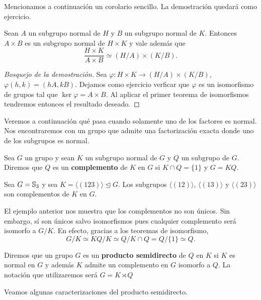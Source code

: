 Mencionamos a continuación un corolario sencillo. La demostración quedará como ejercicio. 

\begin{corollary}
Sean $A$ un subgrupo normal de $H$ y $B$ un subgrupo normal de $K$. Entonces $A\times B$ es un subgrupo normal de $H\times K$ y vale además que
\[
\frac{H\times K}{A\times B}\simeq(H/A)\times(K/B).
\]	
\end{corollary}

\begin{proof}[Bosquejo de la demostración]
Sea $\varphi\colon H\times K\to(H/A)\times(K/B)$, $\varphi(h,k)=(hA,kB)$. Dejamos como ejercicio verficar que $\varphi$ es un isomorfismo de grupos tal que $\ker\varphi=A\times B$. Al aplicar el primer teorema de isomorfismos tendremos entonces el resultado deseado. 
\end{proof}

Veremos a continuación qué pasa cuando solamente uno de los factores es normal. Nos encontraremos con un grupo que admite una factorización exacta donde uno de los subgrupos es normal.  

\begin{definition}
Sea $G$ un grupo y sean $K$ un subgrupo normal de $G$ y $Q$ un subgrupo de $G$. Diremos que $Q$ es un \textbf{complemento} de $K$ en $G$ si $K\cap Q=\{1\}$ y $G=KQ$.
\end{definition} 

\begin{example}
Sea $G=\mathbb{S}_3$ y sea $K=\langle (123)\rangle\unlhd G$. Los subgrupos $\langle (12)\rangle$, $\langle (13)\rangle$ y $\langle (23)\rangle$ son complementos de $K$ en $G$. 
\end{example}

El ejemplo anterior nos muestra que los complementos no son únicos. Sin embargo, sí son únicos salvo isomorfismos pues cualquier complemento será isomorfo a $G/K$. En efecto, gracias a los teoremas de isomorfismo, 
\[
G/K\simeq KQ/K\simeq Q/K\cap Q=Q/\{1\}\simeq Q.
\] 

\begin{definition}
Diremos que un grupo $G$ es un \textbf{producto semidirecto} de $Q$ en $K$ si $K$ es normal en $G$ y además $K$ admite un complemento en $G$ isomorfo a $Q$. La notación que utilizaremos será $G=K\rtimes Q$
\end{definition}

Veamos algunas caracterizaciones del producto semidirecto. 

